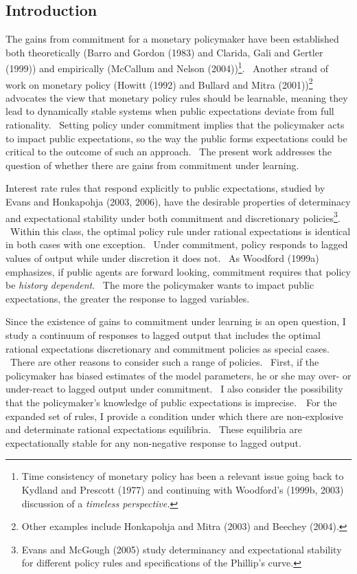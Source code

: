 \documentclass{article}
\begin{document}
\begin{doublespace}

\section{Introduction}

The gains from commitment for a monetary policymaker have been established
both theoretically (Barro and Gordon (1983) and Clarida, Gali and Gertler
(1999)) and empirically (McCallum and Nelson (2004))\footnote{%
Time consistency of monetary policy has been a relevant issue going back to
Kydland and Prescott (1977) and continuing with Woodford's (1999b, 2003)
discussion of a \textit{timeless perspective.}}. \ Another strand of work on
monetary policy (Howitt (1992) and Bullard and Mitra (2001))\footnote{%
Other examples include Honkapohja and Mitra (2003) and Beechey (2004).}
advocates the view that monetary policy rules should be learnable, meaning
they lead to dynamically stable systems when public expectations deviate
from full rationality. \ Setting policy under commitment implies that the
policymaker acts to impact public expectations, so the way the public forms
expectations could be critical to the outcome of such an approach. \ The
present work addresses the question of whether there are gains from
commitment under learning.

Interest rate rules that respond explicitly to public expectations, studied
by Evans and Honkapohja (2003, 2006), have the desirable properties of
determinacy and expectational stability under both commitment and
discretionary policies\footnote{%
Evans and McGough (2005) study determinancy and expectational stability for
different policy rules and specifications of the Phillip's curve.}. \ Within
this class, the optimal policy rule under rational expectations is identical
in both cases with one exception. \ Under commitment, policy responds to
lagged values of output while under discretion it does not. \ As Woodford
(1999a) emphasizes, if public agents are forward looking, commitment
requires that policy be \textit{history dependent}. \ The more the
policymaker wants to impact public expectations, the greater the response to
lagged variables.

Since the existence of gains to commitment under learning is an open
question, I study a continuum of responses to lagged output that includes
the optimal rational expectations discretionary and commitment policies as
special cases. \ There are other reasons to consider such a range of
policies. \ First, if the policymaker has biased estimates of the model
parameters, he or she may over- or under-react to lagged output under
commitment. \ I also consider the possibility that the policymaker's
knowledge of public expectations is imprecise.\ \ For the expanded set of
rules, I provide a condition under which there are non-explosive and
determinate rational expectations equilibria. \ These equilibria are
expectationally stable for any non-negative response to lagged output.


\end{doublespace}
\end{document}
